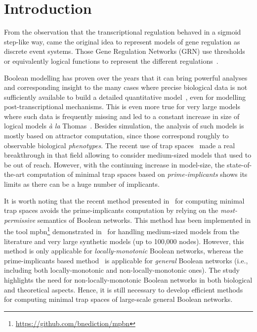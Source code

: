 \documentclass[preprint,12pt]{elsarticle}
\begin{document}
\linenumbers

\section{Introduction}

From the observation that the transcriptional regulation behaved in a sigmoid step-like way, came the original idea to represent models of gene regulation as discrete event systems.
Those Gene Regulation Networks (GRN) use thresholds or equivalently logical functions to represent the different regulations~\cite{glass1973logical,thomas1973boolean,thomas1990biological,thomas1991regulatory}.

Boolean modelling has proven over the years that it can bring powerful analyses and corresponding insight to the many cases where precise biological data is not sufficiently available to build a detailed quantitative model~\cite{wang2012boolean}, even for modelling post-transcriptional mechanisms.
This is even more true for very large models where such data is frequently missing and led to a constant increase in size of logical models \emph{à la} Thomas~\cite{aghamiri2020automated}.
Besides simulation, the analysis of such models is mostly based on attractor computation, since those correspond roughly to observable biological \emph{phenotypes}.
The recent use of trap spaces~\cite{klarner2015computing} made a real breakthrough in that field allowing to consider medium-sized models that used to be out of reach.
However, with the continuing increase in model-size, the state-of-the-art computation of minimal trap spaces based on \emph{prime-implicants} shows its limits as there can be a huge number of implicants.

It is worth noting that the recent method presented in~\cite{DBLP:conf/ictai/ChevalierFPZ19} for computing minimal trap spaces avoids the prime-implicants computation by relying on the \emph{most-permissive} semantics of Boolean networks.
This method has been implemented in the tool mpbn\footnote{\url{https://github.com/bnediction/mpbn}} demonstrated in~\cite{Paulev2020} for handling medium-sized models from the literature and very large synthetic models (up to 100,000 nodes).
However, this method is only applicable for \emph{locally-monotonic} Boolean networks, whereas the prime-implicants based method~\cite{klarner2015computing} is applicable for \emph{general} Boolean networks (i.e., including both locally-monotonic and non-locally-monotonic ones).
The study~\cite{DBLP:journals/tcs/NoualRS13} highlights the need for non-locally-monotonic Boolean networks in both biological and theoretical aspects.
Hence, it is still necessary to develop efficient methods for computing minimal trap spaces of large-scale general Boolean networks.
\end{document}
